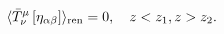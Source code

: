 \begin{equation}
\langle \bar{T}_{\nu }^{\mu }\left[ \eta _{\alpha \beta }\right] \rangle _{%
{\rm ren}}=0,\quad z< z_{1},z> z_{2}.  \label{emtvevflat2}
\end{equation}


